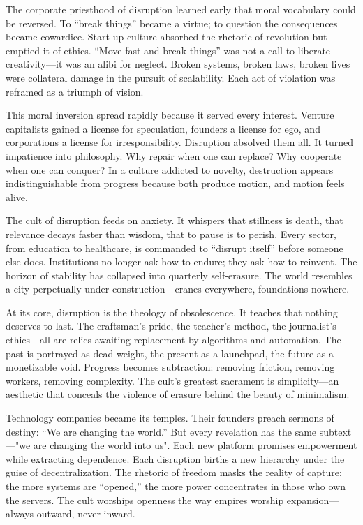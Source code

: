 \documentclass[11pt,twoside]{book}
\begin{document}
The corporate priesthood of disruption learned early that moral vocabulary could be reversed.  To “break things” became a virtue; to question the consequences became cowardice.  Start-up culture absorbed the rhetoric of revolution but emptied it of ethics.  “Move fast and break things” was not a call to liberate creativity—it was an alibi for neglect.  Broken systems, broken laws, broken lives were collateral damage in the pursuit of scalability.  Each act of violation was reframed as a triumph of vision.

This moral inversion spread rapidly because it served every interest.  Venture capitalists gained a license for speculation, founders a license for ego, and corporations a license for irresponsibility.  Disruption absolved them all.  It turned impatience into philosophy.  Why repair when one can replace?  Why cooperate when one can conquer?  In a culture addicted to novelty, destruction appears indistinguishable from progress because both produce motion, and motion feels alive.

The cult of disruption feeds on anxiety.  It whispers that stillness is death, that relevance decays faster than wisdom, that to pause is to perish.  Every sector, from education to healthcare, is commanded to “disrupt itself” before someone else does.  Institutions no longer ask how to endure; they ask how to reinvent.  The horizon of stability has collapsed into quarterly self-erasure.  The world resembles a city perpetually under construction—cranes everywhere, foundations nowhere.

At its core, disruption is the theology of obsolescence.  It teaches that nothing deserves to last.  The craftsman’s pride, the teacher’s method, the journalist’s ethics—all are relics awaiting replacement by algorithms and automation.  The past is portrayed as dead weight, the present as a launchpad, the future as a monetizable void.  Progress becomes subtraction: removing friction, removing workers, removing complexity.  The cult’s greatest sacrament is simplicity—an aesthetic that conceals the violence of erasure behind the beauty of minimalism.

Technology companies became its temples.  Their founders preach sermons of destiny: “We are changing the world.”  But every revelation has the same subtext—"we are changing the world into us".  Each new platform promises empowerment while extracting dependence.  Each disruption births a new hierarchy under the guise of decentralization.  The rhetoric of freedom masks the reality of capture: the more systems are “opened,” the more power concentrates in those who own the servers.  The cult worships openness the way empires worship expansion—always outward, never inward.
\end{document}
